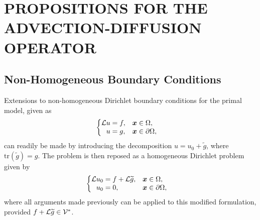 \chapter{PROPOSITIONS FOR THE ADVECTION-DIFFUSION OPERATOR}
\label{chap:vmsapp}

\let\thefootnote\relax{}

\section{Non-Homogeneous Boundary Conditions}
\label{app:bcs}

Extensions to non-homogeneous Dirichlet boundary conditions
for the primal model, given as
%
\begin{gather}
\begin{cases}
\begin{aligned}
\mathcal{L} u &= f, & & \boldsymbol{x} \in \Omega, \\
u &= g, & & \boldsymbol{x} \in \partial \Omega,
\end{aligned}
\end{cases}
\label{eq:bcs_primal_pde}
\end{gather}
%
can readily be made by introducing the decomposition
$u = u_0 + \tilde{g}$, where $\text{tr}({\tilde{g}}) = g$.
The problem is then reposed as a homogeneous
Dirichlet problem given by
%
\begin{gather}
\begin{cases}
\begin{aligned}
\mathcal{L} u_0 &= f + \mathcal{L} \widetilde{g}, & & \boldsymbol{x} \in \Omega, \\
u_0 &= 0, & & \boldsymbol{x} \in \partial \Omega,
\end{aligned}
\end{cases}
\end{gather}
%
where all arguments made previously can be applied to this
modified formulation, provided $f + \mathcal{L} \widetilde{g} \in \mathcal{V}^*$.

